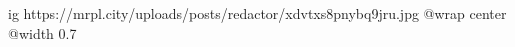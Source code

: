  
 
 
 
 

\ifcmt
  ig https://mrpl.city/uploads/posts/redactor/xdvtxs8pnybq9jru.jpg
  @wrap center
  @width 0.7
\fi
